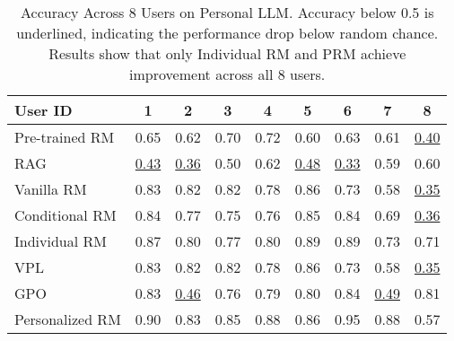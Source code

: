 \begin{table*}
\centering
\begin{tabular}{lcccccccc}
\toprule
User ID & 1 & 2 & 3 & 4 & 5 & 6 & 7 & 8 \\
\midrule
 Pre-trained RM & 0.65 & 0.62 & 0.70 & 0.72 & 0.60 & 0.63 & 0.61 & \underline{0.40} \\
 RAG & \underline{0.43} & \underline{0.36} & 0.50 & 0.62 & \underline{0.48} & \underline{0.33} & 0.59 & 0.60 \\
 Vanilla RM & 0.83 & 0.82 & 0.82 & 0.78 & 0.86 & 0.73 & 0.58 & \underline{0.35} \\
 Conditional RM & 0.84 & 0.77 & 0.75 & 0.76 & 0.85 & 0.84 & 0.69 & \underline{0.36} \\
 Individual RM & 0.87 & 0.80 & 0.77 & 0.80 & 0.89 & 0.89 & 0.73 & 0.71 \\
 VPL & 0.83 & 0.82 & 0.82 & 0.78 & 0.86 & 0.73 & 0.58 & \underline{0.35} \\
 GPO & 0.83 & \underline{0.46} & 0.76 & 0.79 & 0.80 & 0.84 & \underline{0.49} & 0.81 \\
 Personalized RM & 0.90 & 0.83 & 0.85 & 0.88 & 0.86 & 0.95 & 0.88 & 0.57 \\
\bottomrule
\end{tabular}
\caption{Accuracy Across 8 Users on Personal LLM. Accuracy below 0.5 is underlined, indicating the performance drop below random chance. Results show that only Individual RM and PRM achieve improvement across all 8 users.}
\label{table: accuracy across users}
\end{table*}
